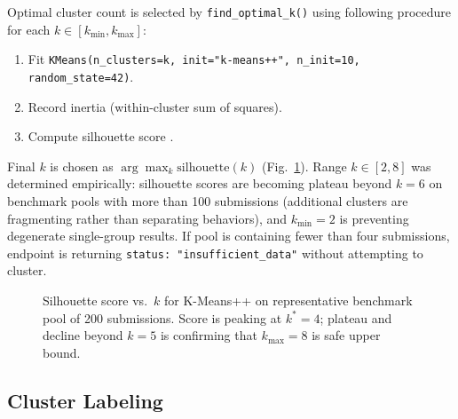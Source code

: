 \documentclass[conference]{IEEEtran}
\begin{document}
Optimal cluster count is selected by \texttt{find\_optimal\_k()} using following procedure for each $k \in [k_{\min}, k_{\max}]$:
\begin{enumerate}
  \item Fit \texttt{KMeans(n\_clusters=k, init="k-means++", n\_init=10,
        random\_state=42)}.
  \item Record inertia (within-cluster sum of squares).
  \item Compute silhouette score \cite{rousseeuw1987silhouettes}.
\end{enumerate}
Final $k$ is chosen as $\arg\max_k \text{silhouette}(k)$ (Fig.~\ref{fig:silhouette}). Range $k \in [2, 8]$ was determined empirically: silhouette scores are becoming plateau beyond $k = 6$ on benchmark pools with more than 100 submissions (additional clusters are fragmenting rather than separating behaviors), and $k_{\min} = 2$ is preventing degenerate single-group results. If pool is containing fewer than four submissions, endpoint is returning \texttt{status: "insufficient\_data"} without attempting to cluster.

\begin{figure}[ht]
\centering
{}
\caption{Silhouette score vs.\ $k$ for K-Means++ on representative
benchmark pool of 200 submissions. Score is peaking at $k^*=4$; plateau
and decline beyond $k=5$ is confirming that $k_{\max}=8$ is safe upper
bound.}
\label{fig:silhouette}
\end{figure}

\subsection{Cluster Labeling}
\end{document}
